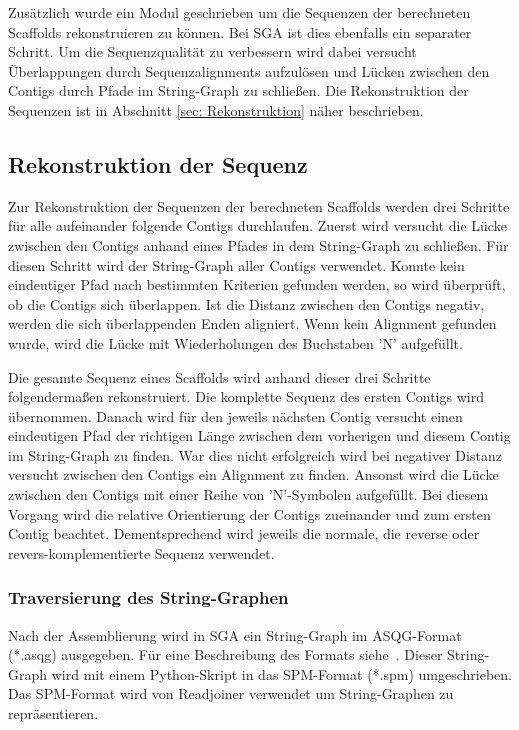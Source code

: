 \documentclass[a4paper,10pt,parskip]{scrartcl}
\begin{document}
Zusätzlich wurde ein Modul geschrieben um die Sequenzen der
berechneten Scaffolds rekonstruieren zu können. Bei SGA ist dies
ebenfalls ein separater Schritt. Um die Sequenzqualität zu verbessern
wird dabei versucht Überlappungen durch Sequenzalignments aufzulösen
und Lücken zwischen den Contigs durch Pfade im String-Graph zu
schließen. Die Rekonstruktion der Sequenzen ist in Abschnitt \ref{sec:
  Rekonstruktion} näher beschrieben.

\subsection{Rekonstruktion der Sequenz}
\label{sec: Rekonstruktion}
Zur Rekonstruktion der Sequenzen der berechneten Scaffolds werden drei
Schritte für alle aufeinander folgende Contigs durchlaufen. Zuerst
wird versucht die Lücke zwischen den Contigs anhand eines Pfades
in dem String-Graph zu schließen. Für diesen Schritt wird der
String-Graph aller Contigs verwendet. Konnte kein eindeutiger Pfad nach
bestimmten Kriterien gefunden werden, so wird überprüft, ob die
Contigs sich überlappen. Ist die Distanz zwischen den Contigs negativ,
werden die sich überlappenden Enden aligniert. Wenn kein Alignment
gefunden wurde, wird die Lücke mit Wiederholungen des Buchstaben 'N'
aufgefüllt.

Die gesamte Sequenz eines Scaffolds wird anhand dieser drei Schritte
folgendermaßen rekonstruiert. Die komplette Sequenz des ersten Contigs
wird übernommen. Danach wird für den jeweils nächsten Contig versucht
einen eindeutigen Pfad der richtigen Länge zwischen dem vorherigen und
diesem Contig im String-Graph zu finden. War dies nicht erfolgreich
wird bei negativer Distanz versucht zwischen den Contigs ein Alignment
zu finden. Ansonst wird die Lücke zwischen den Contigs mit einer Reihe
von 'N'-Symbolen aufgefüllt. Bei diesem Vorgang wird die relative
Orientierung der Contigs zueinander und zum ersten Contig
beachtet. Dementsprechend wird jeweils die normale, die reverse oder
revers-komplementierte Sequenz verwendet.

\subsubsection{Traversierung des String-Graphen}
Nach der Assemblierung wird in SGA ein String-Graph im ASQG-Format
(*.asqg) ausgegeben. Für eine Beschreibung des Formats
siehe~\cite{asqg}. Dieser String-Graph wird mit einem Python-Skript in
das SPM-Format (*.spm) umgeschrieben. Das SPM-Format wird von
Readjoiner verwendet um String-Graphen zu repräsentieren.
\end{document}
